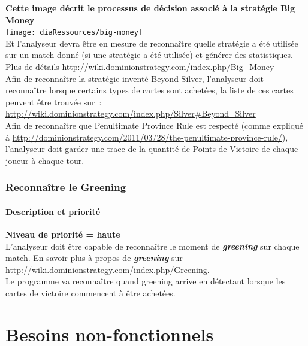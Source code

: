 \textbf{Cette image décrit le processus de décision associé à la stratégie Big Money}\\
\texttt{[image: diaRessources/big-money]}\\
Et l'analyseur devra être en mesure de reconnaître quelle stratégie a été utilisée sur un match donné (si une  stratégie a été utilisée) et générer des statistiques.\\
Plus de détails \url{http://wiki.dominionstrategy.com/index.php/Big_Money}\\

Afin de reconnaître la stratégie inventé Beyond Silver, l'analyseur doit reconnaître lorsque certains types de cartes sont achetées, la liste de ces cartes peuvent être trouvée sur : \url{http://wiki.dominionstrategy.com/index.php/Silver#Beyond_Silver}\\

Afin de reconnaître que Penultimate Province Rule est respecté (comme expliqué à \url{http://dominionstrategy.com/2011/03/28/the-penultimate-province-rule/}), l’analyseur doit garder une trace de la quantité de Points de Victoire de chaque joueur à chaque tour.

\subsubsection{Reconnaître le Greening}
\paragraph*{Description et priorité}
\textbf{Niveau de priorité = haute}\\

L'analyseur doit être capable de reconnaître le moment de \textit{\textbf{greening}} sur chaque match.
En savoir plus à propos de \textit{\textbf{greening}} sur \url{http://wiki.dominionstrategy.com/index.php/Greening}.\\
Le programme va reconnaître quand greening arrive en détectant lorsque les cartes de victoire commencent à être achetées.

\newpage

\section{Besoins non-fonctionnels}

